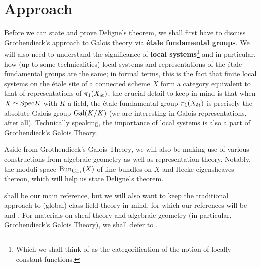 	\section{Approach}
	    Before we can state and prove Deligne's theorem, we shall first have to discuss Grothendieck's approach to Galois theory via \textbf{\'etale fundamental groups}. We will also need to understand the significance of \textbf{local systems}\footnote{Which we shall think of as the categorification of the notion of locally constant functions.} and in particular, how (up to some technicalities) local systems and representations of the \'etale fundamental groups are the same; in formal terms, this is the fact that finite local systems on the \'etale site of a connected scheme $X$ form a category equivalent to that of representations of $\pi_1(X_{\mathrm{\acute{e}t}})$; the crucial detail to keep in mind is that when $X \simeq \mathrm{Spec} K$ with $K$ a field, the \'etale fundamental group $\pi_1(X_{\mathrm{\acute{e}t}})$ is precisely the absolute Galois group $\mathrm{Gal}(\bar{K}/K)$ (we are interesting in Galois representations, after all). Technically speaking, the importance of local systems is also a part of Grothendieck's Galois Theory. 
	    
	    Aside from Grothendieck's Galois Theory, we will also be making use of various constructions from algebraic geometry as well as representation theory. Notably, the moduli space $\mathrm{Bun}_{\operatorname{GL}_1}(X)$ of line bundles on $X$ and Hecke eigensheaves thereon, which will help us state Deligne's theorem. 
	    
	    \cite{tendler_2015_geometric_class_field_theory} shall be our main reference, but we will also want to keep the traditional approach to (global) class field theory in mind, for which our references will be \cite[Chapter VI]{neukirch_2010_algebraic_number_theory} and \cite[Chapter VIII]{neukirch_1999_cohomology_of_number_field}. For materials on sheaf theory and algebraic geometry (in particular, Grothendieck's Galois Theory), we shall defer to \cite{stacks}. 
	
	\printbibliography

